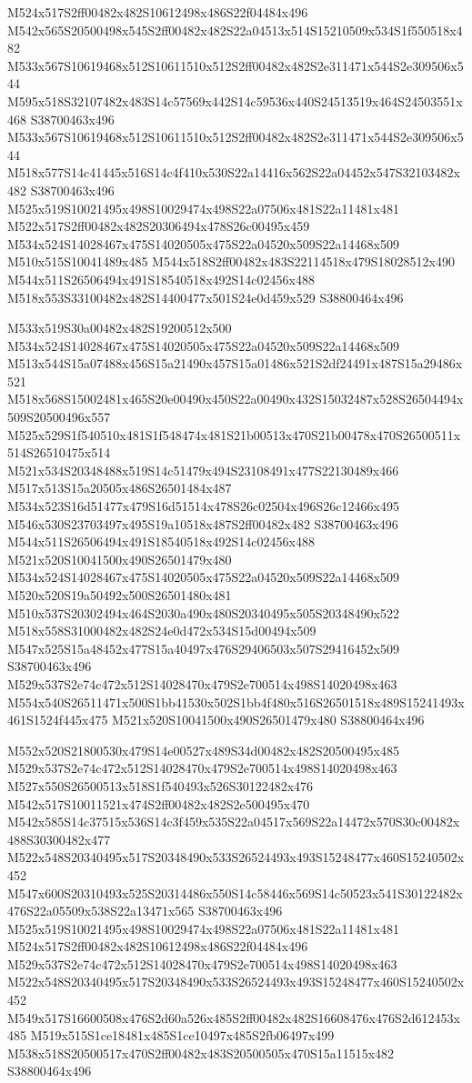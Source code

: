 \documentclass{article}
\begin{document}
\begin{multicols}{2}
M524x517S2ff00482x482S10612498x486S22f04484x496 M542x565S20500498x545S2ff00482x482S22a04513x514S15210509x534S1f550518x482 M533x567S10619468x512S10611510x512S2ff00482x482S2e311471x544S2e309506x544 M595x518S32107482x483S14c57569x442S14c59536x440S24513519x464S24503551x468 S38700463x496 M533x567S10619468x512S10611510x512S2ff00482x482S2e311471x544S2e309506x544 M518x577S14c41445x516S14c4f410x530S22a14416x562S22a04452x547S32103482x482 S38700463x496 M525x519S10021495x498S10029474x498S22a07506x481S22a11481x481 M522x517S2ff00482x482S20306494x478S26c00495x459 M534x524S14028467x475S14020505x475S22a04520x509S22a14468x509 M510x515S10041489x485 M544x518S2ff00482x483S22114518x479S18028512x490 M544x511S26506494x491S18540518x492S14c02456x488 M518x553S33100482x482S14400477x501S24e0d459x529 S38800464x496

M533x519S30a00482x482S19200512x500 M534x524S14028467x475S14020505x475S22a04520x509S22a14468x509 M513x544S15a07488x456S15a21490x457S15a01486x521S2df24491x487S15a29486x521 M518x568S15002481x465S20e00490x450S22a00490x432S15032487x528S26504494x509S20500496x557 M525x529S1f540510x481S1f548474x481S21b00513x470S21b00478x470S26500511x514S26510475x514 M521x534S20348488x519S14c51479x494S23108491x477S22130489x466 M517x513S15a20505x486S26501484x487 M534x523S16d51477x479S16d51514x478S26c02504x496S26c12466x495 M546x530S23703497x495S19a10518x487S2ff00482x482 S38700463x496 M544x511S26506494x491S18540518x492S14c02456x488 M521x520S10041500x490S26501479x480 M534x524S14028467x475S14020505x475S22a04520x509S22a14468x509 M520x520S19a50492x500S26501480x481 M510x537S20302494x464S2030a490x480S20340495x505S20348490x522 M518x558S31000482x482S24e0d472x534S15d00494x509 M547x525S15a48452x477S15a40497x476S29406503x507S29416452x509 S38700463x496 M529x537S2e74c472x512S14028470x479S2e700514x498S14020498x463 M554x540S26511471x500S1bb41530x502S1bb4f480x516S26501518x489S15241493x461S1524f445x475 M521x520S10041500x490S26501479x480 S38800464x496

M552x520S21800530x479S14e00527x489S34d00482x482S20500495x485 M529x537S2e74c472x512S14028470x479S2e700514x498S14020498x463 M527x550S26500513x518S1f540493x526S30122482x476 M542x517S10011521x474S2ff00482x482S2e500495x470 M542x585S14c37515x536S14c3f459x535S22a04517x569S22a14472x570S30c00482x488S30300482x477 M522x548S20340495x517S20348490x533S26524493x493S15248477x460S15240502x452 M547x600S20310493x525S20314486x550S14c58446x569S14c50523x541S30122482x476S22a05509x538S22a13471x565 S38700463x496 M525x519S10021495x498S10029474x498S22a07506x481S22a11481x481 M524x517S2ff00482x482S10612498x486S22f04484x496 M529x537S2e74c472x512S14028470x479S2e700514x498S14020498x463 M522x548S20340495x517S20348490x533S26524493x493S15248477x460S15240502x452 M549x517S16600508x476S2d60a526x485S2ff00482x482S16608476x476S2d612453x485 M519x515S1ce18481x485S1ce10497x485S2fb06497x499 M538x518S20500517x470S2ff00482x483S20500505x470S15a11515x482 S38800464x496


\end{multicols}
\end{document}
